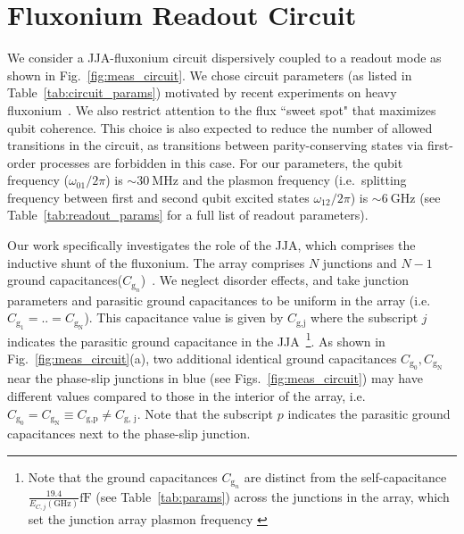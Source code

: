 \documentclass[%
reprint,
superscriptaddress,
 amsmath,amssymb,
 aps,
 prx,
longbibliography,
floatfix,
]{revtex4-2}
\begin{document}
\section{Fluxonium Readout Circuit}\label{sec:Fluxonium}


We consider a JJA-fluxonium circuit dispersively coupled to a readout mode as shown in Fig.~\ref{fig:meas_circuit}. We chose circuit parameters (as listed in Table~\ref{tab:circuit_params}) motivated by recent experiments on heavy fluxonium~\cite{zhang_tunable_2024,zhang_universal_2021, ding_high-fidelity_2023}.  We also restrict attention to the flux ``sweet spot" that maximizes qubit coherence.
This choice is also expected to reduce the number of allowed transitions in the circuit, as transitions between parity-conserving states via first-order processes are forbidden in this case. For our parameters, the qubit frequency ($\omega_{01}/2\pi$) is $\sim 30 \ \mathrm{MHz}$ and the plasmon frequency (i.e.~splitting frequency between first and second qubit excited states $\omega_{12}/2\pi$) is $\sim 6 \ \mathrm{GHz}$ (see Table~\ref{tab:readout_params} for a full list of readout parameters).
 

Our work specifically investigates the role of the JJA, which comprises the inductive shunt of the fluxonium. The array comprises $N$ junctions and $N-1$ ground capacitances($C_{\textrm{g}_n}$)~\cite{manucharyan2009fluxonium}. We neglect disorder effects, and take junction parameters and parasitic ground capacitances to be uniform in the array (i.e.~$C_{\textrm{g}_1}=..=C_{\textrm{g}_\textrm{N}}$). This capacitance value is given by $C_\textrm{g,j}$ where the subscript $j$ indicates the parasitic ground capacitance in the JJA~\footnote{Note that the ground capacitances $C_{\textrm{g}_n}$ are distinct from the self-capacitance $\frac{19.4}{E_{C,j}(\mathrm{GHz})}\mathrm{fF}$ (see Table~\ref{tab:params}) across the junctions in the array, which set the junction array plasmon frequency \cite{catelani2011relaxation}}. As shown in Fig.~\ref{fig:meas_circuit}(a), 
two additional identical ground capacitances $C_{\textrm{g}_0}, C_{\textrm{g}_\textrm{N}}$ near the phase-slip junctions in blue (see Figs.~\ref{fig:meas_circuit}) may have different values compared to those in the interior of the array, i.e.~
$C_{\textrm{g}_0}=C_{\textrm{g}_\textrm{N}}\equiv C_\textrm{g,p}\neq C_\textrm{g, j}$. Note that the subscript $p$ indicates the parasitic ground capacitances next to the phase-slip junction.
\end{document}
